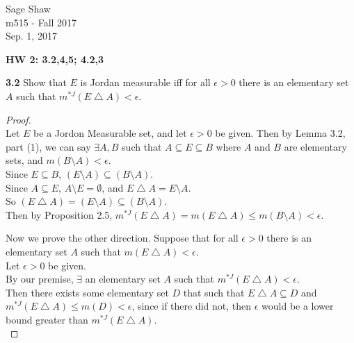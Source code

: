 \documentclass[12pt]{article}
\begin{document}
	\thispagestyle{empty}
	
\begin{flushright}
	Sage Shaw \\
	m515 - Fall 2017 \\
	Sep. 1, 2017
\end{flushright}
	
{\large \textbf{HW 2: 3.2,4,5; 4.2,3}}\bigbreak

\hspace{-4 ex}\textbf{3.2} Show that $E$ is Jordan measurable iff for all $\epsilon>0$ there is an elementary set $A$ such that $m^{*J}(E\bigtriangleup A)<\epsilon$. \bigbreak

	\begin{proof}\text{ }\\
		Let $E$ be a Jordon Measurable set, and let $\epsilon >0$ be given. Then by Lemma 3.2, part (1), we can say $\exists A,B$ such that $A \subseteq E \subseteq B$ where $A$ and $B$ are elementary sets, and $m(B\setminus A)< \epsilon$. \\
		Since $E \subseteq B$, $(E \setminus A) \subseteq (B \setminus A)$. \\
		Since $A \subseteq E$, $A \setminus E = \emptyset$, and $E \bigtriangleup A = E \setminus A$. \\ 
		So $(E \bigtriangleup A) = (E \setminus A) \subseteq (B \setminus A)$.\\
		Then by Proposition 2.5, $m^{*J}(E \bigtriangleup A) = m(E \bigtriangleup A) \leq m(B \setminus A) < \epsilon$.\bigbreak
		
		Now we prove the other direction. Suppose that for all $\epsilon>0$ there is an elementary set $A$ such that $m(E\bigtriangleup A)<\epsilon$.\\
		
		Let $\epsilon > 0$ be given. \\
		
		By our premise, $\exists $ an elementary set $A$ such that $m^{*J}(E\bigtriangleup A)<\epsilon$. \\
		
		Then there exists some elementary set $D$ that such that $E \bigtriangleup A \subseteq D$ and $m^{*J}(E\bigtriangleup A) \leq m(D) < \epsilon$, since if there did not, then $\epsilon$ would be a lower bound greater than $m^{*J}(E\bigtriangleup A)$. \\
		

\end{proof}
\end{document}
